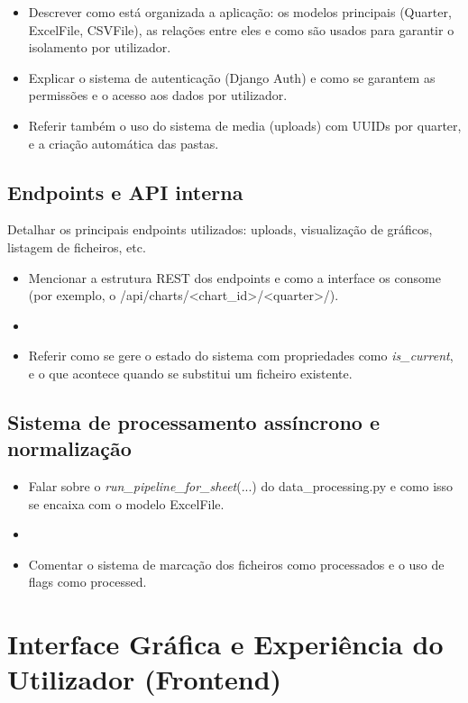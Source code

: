     \begin{itemize}
        \item Descrever como está organizada a aplicação: os modelos principais (Quarter, ExcelFile, CSVFile), as relações entre eles e como são usados para garantir o isolamento por utilizador.
        \item Explicar o sistema de autenticação (Django Auth) e como se garantem as permissões e o acesso aos dados por utilizador.
        \item Referir também o uso do sistema de media (uploads) com UUIDs por quarter, e a criação automática das pastas.
    \end{itemize}

\subsection{Endpoints e API interna}

    Detalhar os principais endpoints utilizados: uploads, visualização de gráficos, listagem de ficheiros, etc.

    \begin{itemize}
        \item Mencionar a estrutura REST dos endpoints e como a interface os consome (por exemplo, o /api/charts/<chart_id>/<quarter>/).
        \item 
        \item Referir como se gere o estado do sistema com propriedades como \textit{is_current}, e o que acontece quando se substitui um ficheiro existente.
    \end{itemize}

\subsection{Sistema de processamento assíncrono e normalização}

    \begin{itemize}
        \item Falar sobre o \textit{run_pipeline_for_sheet}(...) do data_processing.py e como isso se encaixa com o modelo ExcelFile.
        \item 
        \item Comentar o sistema de marcação dos ficheiros como processados e o uso de flags como processed.
    \end{itemize}



    \section{Interface Gráfica e Experiência do Utilizador (Frontend)}

